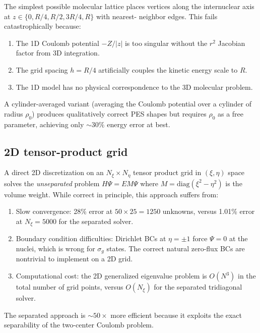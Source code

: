 \documentclass[aps,pra,twocolumn,superscriptaddress,longbibliography]{revtex4-2}
\begin{document}
The simplest possible molecular lattice places vertices along the
internuclear axis at $z \in \{0, R/4, R/2, 3R/4, R\}$ with nearest-
neighbor edges.  This fails catastrophically because:
\begin{enumerate}
  \item The 1D Coulomb potential $-Z/|z|$ is too singular without
    the $r^2$ Jacobian factor from 3D integration.
  \item The grid spacing $h = R/4$ artificially couples the kinetic
    energy scale to $R$.
  \item The 1D model has no physical correspondence to the 3D
    molecular problem.
\end{enumerate}
A cylinder-averaged variant (averaging the Coulomb potential over
a cylinder of radius $\rho_0$) produces qualitatively correct PES
shapes but requires $\rho_0$ as a free parameter, achieving only
$\sim 30\%$ energy error at best.

\subsection{2D tensor-product grid}

A direct 2D discretization on an $N_\xi \times N_\eta$ tensor product
grid in $(\xi, \eta)$ space solves the \emph{unseparated} problem
$H\Psi = E M \Psi$ where $M = \mathrm{diag}(\xi^2 - \eta^2)$ is
the volume weight.  While correct in principle, this approach suffers
from:
\begin{enumerate}
  \item Slow convergence: 28\% error at $50 \times 25 = 1250$
    unknowns, versus 1.01\% error at $N_\xi = 5000$ for the separated
    solver.
  \item Boundary condition difficulties: Dirichlet BCs at
    $\eta = \pm 1$ force $\Psi = 0$ at the nuclei, which is wrong
    for $\sigma_g$ states.  The correct natural zero-flux BCs are
    nontrivial to implement on a 2D grid.
  \item Computational cost: the 2D generalized eigenvalue problem
    is $O(N^3)$ in the total number of grid points, versus $O(N_\xi)$
    for the separated tridiagonal solver.
\end{enumerate}

The separated approach is $\sim 50\times$ more efficient because it
exploits the exact separability of the two-center Coulomb problem.

\end{document}
